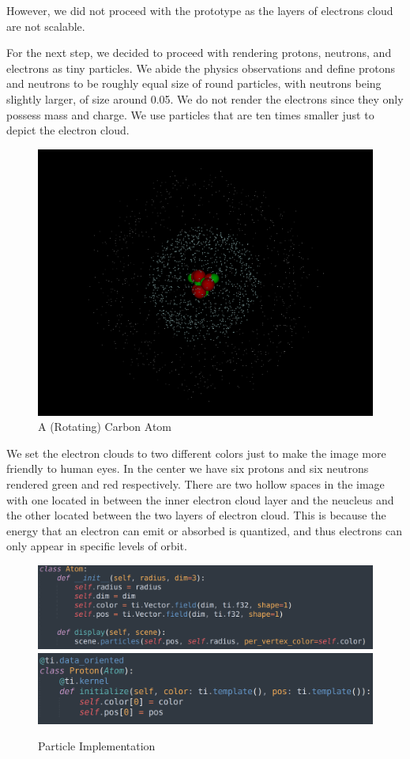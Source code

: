 \documentclass[acmtog]{acmart}
\begin{document}
However, we did not proceed with the prototype as the layers of electrons cloud are not scalable.

For the next step, we decided to proceed with rendering protons, neutrons, and electrons as tiny particles.
We abide the physics observations and define protons and neutrons to be roughly equal size of round particles, with neutrons being slightly larger, of size around 0.05. We do not render the electrons since they only possess mass and charge. We use particles that are ten times smaller just to depict the electron cloud.

\begin{figure}[h]
  \centering
  \includegraphics[width=\linewidth]{./carbon.png}
  \caption{A (Rotating) Carbon Atom}
\end{figure}

We set the electron clouds to two different colors just to make the image more friendly to human eyes. In the center we have six protons and six neutrons rendered green and red respectively. There are two hollow spaces in the image with one located in between the inner electron cloud layer and the neucleus and the other located between the two layers of electron cloud. This is because the energy that an electron can emit or absorbed is quantized, and thus electrons can only appear in specific levels of orbit. 

\begin{figure}[h]
  \centering
  \includegraphics[width=\linewidth]{./atom.png}
  \includegraphics[width=\linewidth]{./proton.png}
  \caption{Particle Implementation}
\end{figure}
\end{document}
